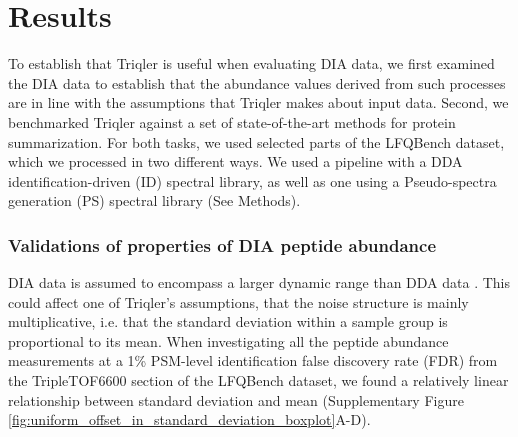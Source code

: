 \documentclass[10pt,letterpaper]{article}
\begin{document}

\section*{Results}

To establish that Triqler is useful when evaluating DIA data, we first examined the DIA data to establish that the abundance values derived from such processes are in line with the assumptions that Triqler makes about input data. Second, we benchmarked Triqler against a set of state-of-the-art methods for protein summarization. For both tasks, we used selected parts of the LFQBench dataset, which we processed in two different ways. We used a pipeline with a DDA identification-driven (ID) spectral library, as well as one using a Pseudo-spectra generation (PS) spectral library (See Methods).


\subsubsection*{Validations of properties of DIA peptide abundance}

DIA data is assumed to encompass a larger dynamic range than DDA data . This could affect one of Triqler's assumptions, that the noise structure is mainly multiplicative, i.e. that the standard deviation within a sample group is proportional to its mean. When investigating all the peptide abundance measurements at a 1\% PSM-level identification false discovery rate (FDR) from the TripleTOF6600 section of the LFQBench dataset, we found a relatively linear relationship between standard deviation and mean (Supplementary Figure \ref{fig:uniform_offset_in_standard_deviation_boxplot}A-D). 
\end{document}
